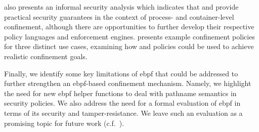  also presents an informal security analysis which indicates that
\bpfbox{} and \bpfcontain{} provide practical security guarantees in the context of
process- and container-level confinement, although there are opportunities to further
develop their respective policy languages and enforcement engines. 
presents example confinement policies for three distinct use cases, examining how
\bpfbox{} and \bpfcontain{} policies could be used to achieve realistic confinement goals.

Finally, we identify some key limitations of \gls{ebpf} that could be addressed to further
strengthen an \gls{ebpf}-based confinement mechanism. Namely, we highlight the need for
new \gls{ebpf} helper functions to deal with pathname semantics in security policies.  We
also address the need for a formal evaluation of \gls{ebpf} in terms of its security and
tamper-resistance. We leave such an evaluation as a promising topic for future work
(c.f.~).




